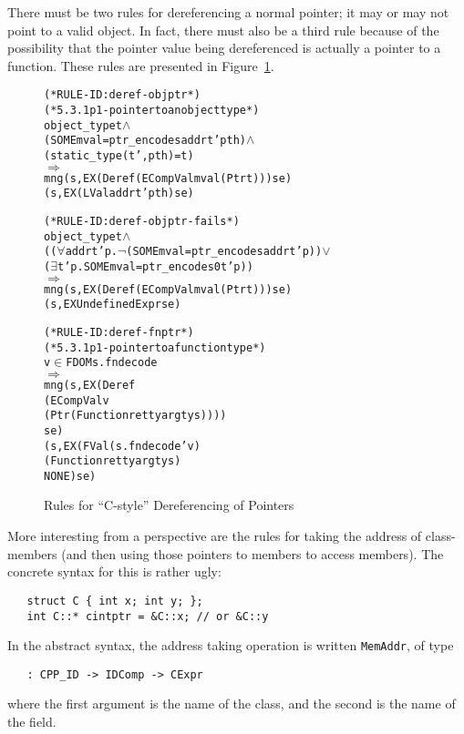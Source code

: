 \documentclass[11pt]{article}
\begin{document}
There must be two rules for dereferencing a normal pointer; it may or
may not point to a valid object.  In fact, there must also be a third
rule because of the possibility that the pointer value being
dereferenced is actually a pointer to a function. These rules are presented in
Figure~\ref{fig:deref-rules}.
\begin{figure}[htbp]
%
%
%
%
\begin{alltt}
(* RULE-ID: deref-objptr *)
(* 5.3.1 p1 - pointer to an object type *)
     object_type t \(\land\)
     (SOME mval = ptr_encode s addr t' pth) \(\land\)
     (static_type (t',pth) = t)
   \(\Rightarrow\)
     mng (s, EX (Deref (ECompVal mval (Ptr t))) se)
         (s, EX (LVal addr t' pth) se)


(* RULE-ID: deref-objptr-fails *)
     object_type t \(\land\)
     ((\(\forall\)addr t' p. \(\neg\)(SOME mval = ptr_encode s addr t' p)) \(\lor\)
      (\(\exists\)t' p. SOME mval = ptr_encode s 0 t' p))
   \(\Rightarrow\)
     mng (s, EX (Deref (ECompVal mval (Ptr t))) se)
         (s, EX UndefinedExpr se)


(* RULE-ID: deref-fnptr *)
(* 5.3.1 p1 - pointer to a function type *)
     v \(\in\) FDOM s.fndecode
   \(\Rightarrow\)
     mng (s, EX (Deref
                  (ECompVal v
                            (Ptr (Function retty argtys))))
                se)
         (s, EX (FVal (s.fndecode ' v)
                      (Function retty argtys)
                      NONE) se)
\end{alltt}
\caption{Rules for ``C-style'' Dereferencing of Pointers}
\label{fig:deref-rules}
\end{figure}

\medskip
\noindent More interesting from a \cpp{} perspective are the rules for
taking the address of class-members (and then using those pointers to
members to access members).  The concrete syntax for this is
rather ugly:
\begin{verbatim}
   struct C { int x; int y; };
   int C::* cintptr = &C::x; // or &C::y
\end{verbatim}
%
In the abstract syntax, the address taking operation is written
\texttt{MemAddr}, of type
\begin{verbatim}
   : CPP_ID -> IDComp -> CExpr
\end{verbatim}
where the first argument is the name of the class, and the second is
the name of the field.
\end{document}
